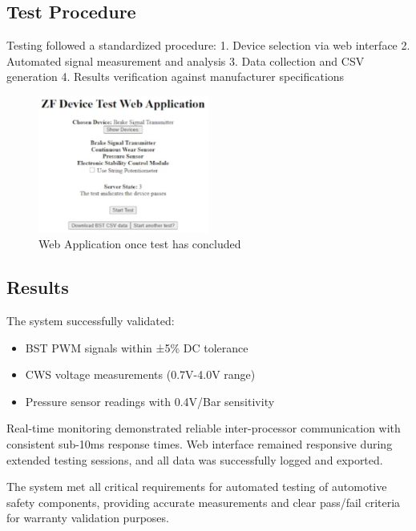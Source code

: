 \documentclass[12pt]{article}
\begin{document}
\subsection{Test Procedure}

Testing followed a standardized procedure: 1. Device selection via web
interface 2. Automated signal measurement and analysis 3. Data collection
and CSV generation 4. Results verification against manufacturer
specifications

\begin{figure}[H]
  \centering
  \includegraphics[width=0.5\textwidth]{../assets/webapp-testing.png}
  \caption{Web Application once test has concluded}
\end{figure}

\subsection{Results}

The system successfully validated: 
\begin{itemize} 
  \item BST PWM signals within ±5\% DC tolerance 
  \item CWS voltage measurements (0.7V-4.0V range) 
  \item Pressure sensor readings with 0.4V/Bar sensitivity
\end{itemize}


Real-time monitoring demonstrated reliable inter-processor communication
with consistent sub-10ms response times. Web interface remained responsive
during extended testing sessions, and all data was successfully logged and
exported.


The system met all critical requirements for automated testing of
automotive safety components, providing accurate measurements and clear
pass/fail criteria for warranty validation purposes.
\end{document}
